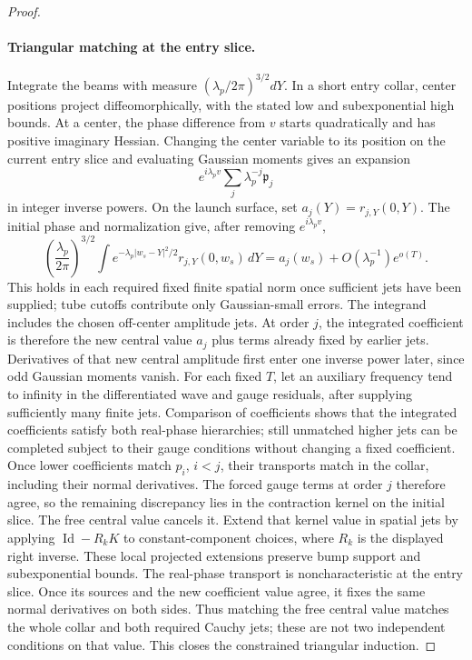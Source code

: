 \begin{proof}
\paragraph{Triangular matching at the entry slice.}
Integrate the beams with measure
$(\lambda_p/2\pi)^{3/2}dY$. In a short entry collar, center
positions project diffeomorphically, with the stated low and
subexponential high bounds. At a center, the phase difference
from $v$ starts quadratically and has positive imaginary Hessian.
Changing the center variable to its position on the current
entry slice and evaluating Gaussian moments gives an expansion
\[
 e^{i\lambda_pv}\sum_j\lambda_p^{-j}\mathfrak p_j
\]
in integer inverse powers. On the launch surface, set
$a_j(Y)=r_{j,Y}(0,Y)$. The initial phase and normalization give,
after removing $e^{i\lambda_pv}$,
\[
 \left(\frac{\lambda_p}{2\pi}\right)^{3/2}
 \int e^{-\lambda_p|w_s-Y|^2/2}r_{j,Y}(0,w_s)\,dY
 =a_j(w_s)+O(\lambda_p^{-1})e^{o(T)}.
\]
This holds in each required fixed finite spatial norm once
sufficient jets have been supplied; tube cutoffs contribute only
Gaussian-small errors. The integrand includes the chosen off-center
amplitude jets. At order $j$, the integrated coefficient is therefore
the new central value $a_j$ plus terms already fixed by earlier jets.
Derivatives of that new central amplitude first enter one inverse
power later, since odd Gaussian moments vanish.
For each fixed $T$, let an auxiliary frequency tend
to infinity in the differentiated wave and gauge residuals, after
supplying sufficiently many finite jets. Comparison of coefficients
shows that the integrated coefficients satisfy both real-phase
hierarchies; still unmatched higher jets can be completed subject
to their gauge conditions without changing a fixed coefficient.
Once lower coefficients match $p_i$, $i<j$, their transports match
in the collar, including their normal derivatives. The forced gauge
terms at order $j$ therefore agree, so the remaining discrepancy
lies in the contraction kernel on the initial slice. The free
central value cancels it. Extend that kernel value in spatial jets
by applying $\operatorname{Id}-R_kK$ to constant-component choices,
where $R_k$ is the displayed right inverse. These local projected
extensions preserve bump support and subexponential bounds.
The real-phase transport is noncharacteristic at the entry slice.
Once its sources and the new coefficient value agree, it fixes the
same normal derivatives on both sides. Thus matching the free central
value matches the whole collar and both required Cauchy jets; these
are not two independent conditions on that value.
This closes the constrained triangular induction.


\end{proof}
